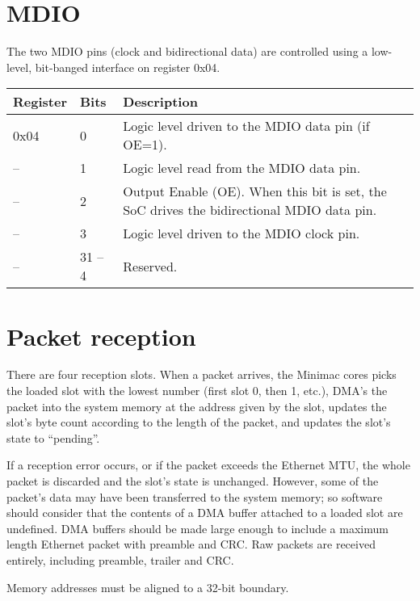 \documentclass[a4paper,11pt]{article}
\begin{document}
\section{MDIO}
The two MDIO pins (clock and bidirectional data) are controlled using a low-level, bit-banged interface on register 0x04.

\begin{tabularx}{450pt}{|l|l|X|}
\hline
\textbf{Register} & \textbf{Bits} & \textbf{Description} \\
\hline
0x04 & 0 & Logic level driven to the MDIO data pin (if OE=1). \\
\hline
-- & 1 & Logic level read from the MDIO data pin. \\
\hline
-- & 2 & Output Enable (OE). When this bit is set, the SoC drives the bidirectional MDIO data pin. \\
\hline
-- & 3 & Logic level driven to the MDIO clock pin. \\
\hline
-- & 31 -- 4 & Reserved. \\
\hline
\end{tabularx}

\section{Packet reception}
There are four reception slots. When a packet arrives, the Minimac cores picks the loaded slot with the lowest number (first slot 0, then 1, etc.), DMA's the packet into the system memory at the address given by the slot, updates the slot's byte count according to the length of the packet, and updates the slot's state to ``pending''.

If a reception error occurs, or if the packet exceeds the Ethernet MTU, the whole packet is discarded and the slot's state is unchanged. However, some of the packet's data may have been transferred to the system memory; so software should consider that the contents of a DMA buffer attached to a loaded slot are undefined. DMA buffers should be made large enough to include a maximum length Ethernet packet with preamble and CRC. Raw packets are received entirely, including preamble, trailer and CRC.

Memory addresses must be aligned to a 32-bit boundary.
\end{document}
